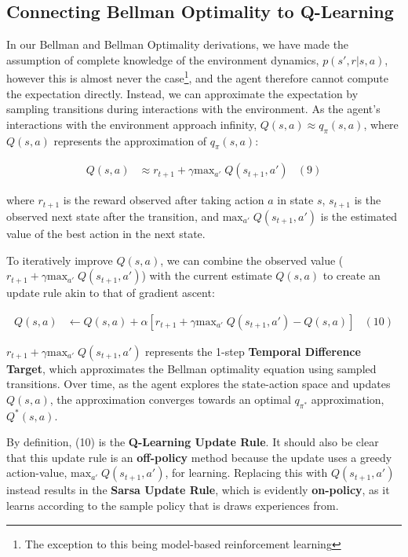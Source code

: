 \documentclass{article}
\begin{document}
\subsection{Connecting Bellman Optimality to Q-Learning}
 In our Bellman and Bellman Optimality derivations, we have made the assumption of complete knowledge of the environment dynamics, $p(s',r|s,a)$, however this is almost never the case\footnote{The exception to this being model-based reinforcement learning}, and the agent therefore cannot compute the expectation directly. Instead, we can approximate the expectation by sampling transitions during interactions with the environment. As the agent's interactions with the environment approach infinity, $Q(s,a)\approx q_{\pi}(s,a)$, where $Q(s,a)$ represents the approximation of $q_{\pi}(s,a)$:
 \vspace{-5mm}\begin{center}
    \begin{align*}
        Q(s,a) &\approx r_{t+1} + \gamma\text{max}_{a'}\;Q(s_{t+1},a') & (9)
    \end{align*}
 \end{center}
 where $r_{t+1}$ is the reward observed after taking action $a$ in state $s$, $s_{t+1}$ is the observed next state after the transition, and $\text{max}_{a'}\;Q(s_{t+1},a')$ is the estimated value of the best action in the next state.

 To iteratively improve $Q(s,a)$, we can combine the observed value ($r_{t+1} + \gamma\text{max}_{a'}\;Q(s_{t+1},a')$) with the current estimate $Q(s,a)$ to create an update rule akin to that of gradient ascent:
 \vspace{-5mm}\begin{center}
    \begin{align*}
        Q(s,a) &\leftarrow Q(s,a) + \alpha[r_{t+1} + \gamma\text{max}_{a'}\;Q(s_{t+1},a') - Q(s,a)] & (10)
    \end{align*}
 \end{center}
$r_{t+1} + \gamma\text{max}_{a'}\;Q(s_{t+1},a')$ represents the 1-step \textbf{Temporal Difference Target}, which approximates the Bellman optimality equation using sampled transitions. Over time, as the agent explores the state-action space and updates $Q(s,a)$, the approximation converges towards an optimal $q_{\pi^*}$ approximation, $Q^*(s,a)$.

By definition, (10) is the \textbf{Q-Learning Update Rule}. It should also be clear that this update rule is an \textbf{off-policy} method because the update uses a greedy action-value, $\text{max}_{a'}\;Q(s_{t+1},a')$, for learning. Replacing this with $Q(s_{t+1},a')$ instead results in the \textbf{Sarsa Update Rule}, which is evidently \textbf{on-policy}, as it learns according to the sample policy that is draws experiences from.
\end{document}
